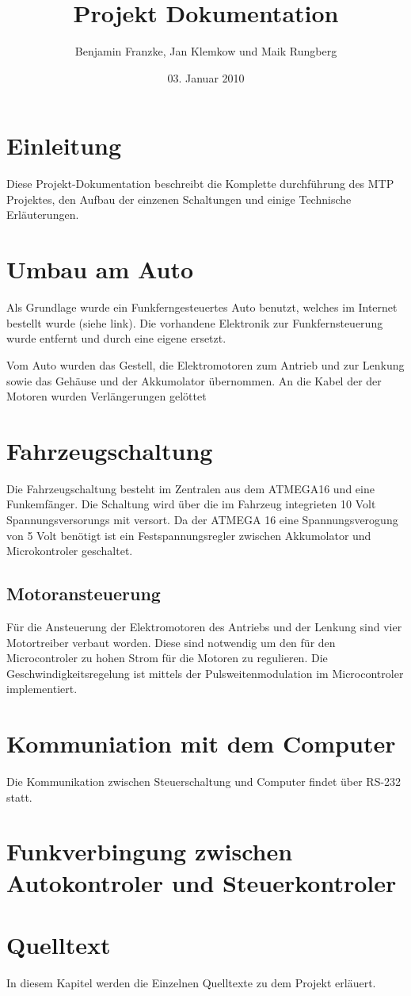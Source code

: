\documentclass{scrartcl}
\title{Projekt Dokumentation}
\author{Benjamin Franzke, Jan Klemkow und Maik Rungberg}
\date{03. Januar 2010}
\begin{document}
\maketitle
\tableofcontents

\section{Einleitung} %
	Diese Projekt-Dokumentation beschreibt die Komplette durchführung des MTP Projektes, den Aufbau der einzenen Schaltungen und einige Technische Erläuterungen.

\section{Umbau am Auto} %
	Als Grundlage wurde ein Funkferngesteuertes Auto benutzt,
	welches im Internet bestellt wurde (siehe link).
	Die vorhandene Elektronik zur Funkfernsteuerung wurde entfernt und durch eine eigene ersetzt.

	Vom Auto wurden das Gestell, die Elektromotoren zum Antrieb und zur Lenkung sowie das Gehäuse und der Akkumolator übernommen.
	An die Kabel der der Motoren wurden Verlängerungen gelöttet 

\section{Fahrzeugschaltung} %
	Die Fahrzeugschaltung besteht im Zentralen aus dem ATMEGA16 und eine Funkemfänger.
	Die Schaltung wird über die im Fahrzeug integrieten 10 Volt Spannungsversorungs mit versort.
	Da der ATMEGA 16 eine Spannungsverogung von 5 Volt benötigt ist ein Festspannungsregler
	zwischen Akkumolator und Microkontroler geschaltet.

	\subsection{Motoransteuerung}
		Für die Ansteuerung der Elektromotoren des Antriebs und der Lenkung sind vier Motortreiber verbaut worden.
		Diese sind notwendig um den für den Microcontroler zu hohen Strom für die Motoren zu regulieren.
		Die Geschwindigkeitsregelung ist mittels der Pulsweitenmodulation im Microcontroler implementiert.


\section{Kommuniation mit dem Computer} %
	Die Kommunikation zwischen Steuerschaltung und Computer findet über RS-232 statt.

\section{Funkverbingung zwischen Autokontroler und Steuerkontroler} %

\section{Quelltext} %
	In diesem Kapitel werden die Einzelnen Quelltexte zu dem Projekt erläuert.
\end{document}
